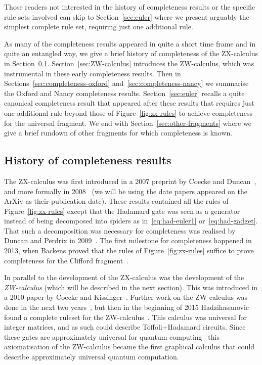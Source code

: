\documentclass[a4paper,onecolumn,superscriptaddress,11pt,%
				unpublished,%
				allowfontchageintitle,%
				]{quantumarticle}
\begin{document}
Those readers not interested in the history of completeness results or the specific rule sets involved can skip to Section~\ref{sec:euler} where we present arguably the simplest complete rule set, requiring just one additional rule.

As many of the completeness results appeared in quite a short time frame and in quite an entangled way, we give a brief history of completeness of the ZX-calculus in Section~\ref{sec:history-completeness}. Section~\ref{sec:ZW-calculus} introduces the ZW-calculus, which was instrumental in these early completeness results. Then in Sections~\ref{sec:completeness-oxford} and~\ref{sec:completeness-nancy} we summarise the Oxford and Nancy completeness results. Section~\ref{sec:euler} recalls a quite canonical completeness result that appeared after these results that requires just one additional rule beyond those of Figure~\ref{fig:zx-rules} to achieve completeness for the universal fragment. We end with Section~\ref{sec:other-fragments} where we give a brief rundown of other fragments for which completeness is known.

\subsection{History of completeness results}\label{sec:history-completeness}

The ZX-calculus was first introduced in a 2007 preprint by Coecke and Duncan~\cite{Coecke2007graphicalcalculus}, and more formally in 2008~\cite{CD1,CD2} (we will be using the date papers appeared on the ArXiv as their publication date). These results contained all the rules of Figure~\ref{fig:zx-rules} except that the Hadamard gate was seen as a generator instead of being decomposed into spiders as in~\eqref{eq:had-euler1} or~\eqref{eq:had-gadget}. That such a decomposition was necessary for completeness was realised by Duncan and Perdrix in 2009~\cite{DP1}.
The first milestone for completeness happened in 2013, when Backens proved that the rules of Figure~\ref{fig:zx-rules} suffice to prove completeness for the Clifford fragment~\cite{BackensCompleteness}.

In parallel to the development of the ZX-calculus was the development of the \emph{ZW-calculus} (which will be described in the next section). This was introduced in a 2010 paper by Coecke and Kissinger~\cite{CoeckeKissinger2010compositional}. Further work on the ZW-calculus was done in the next two years~\cite{Coecke2010rational,kissinger2012phd}, but then in the beginning of 2015 Hadzihasanovic found a complete ruleset for the ZW-calculus~\cite{hadzihasanovic2015diagrammatic}. This calculus was universal for integer matrices, and as such could describe Toffoli+Hadamard circuits. Since these gates are approximately universal for quantum computing~\cite{ShiToffoliHadamard,aharonov2003simple} this axiomatisation of the ZW-calculus became the first graphical calculus that could describe approximately universal quantum computation.
\end{document}
